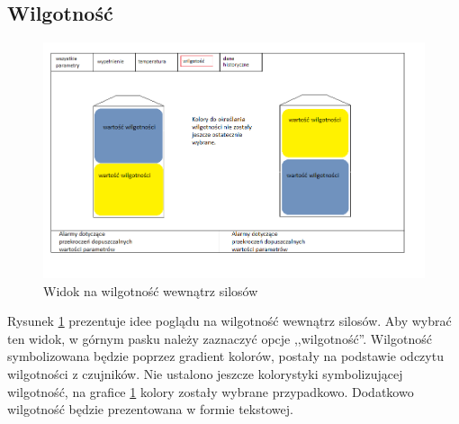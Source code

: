     \subsection{Wilgotność}
        \begin{figure}[H]
            \centering
            \includegraphics[width = \textwidth]{obrazy/projekt_grafiki/wilgotność.png}
            \caption{Widok na wilgotność wewnątrz silosów}
            \label{fig: wilgotnosc}
        \end{figure}
        Rysunek \ref{fig: wilgotnosc} prezentuje idee poglądu na wilgotność wewnątrz silosów. Aby wybrać ten widok,
        w górnym pasku należy zaznaczyć opcje ,,wilgotność''. Wilgotność symbolizowana będzie poprzez gradient kolorów,
        postały na podstawie odczytu wilgotności z czujników. Nie ustalono jeszcze kolorystyki symbolizującej wilgotność, na grafice \ref{fig: wilgotnosc} kolory zostały wybrane przypadkowo. Dodatkowo wilgotność będzie prezentowana w formie 
        tekstowej.


